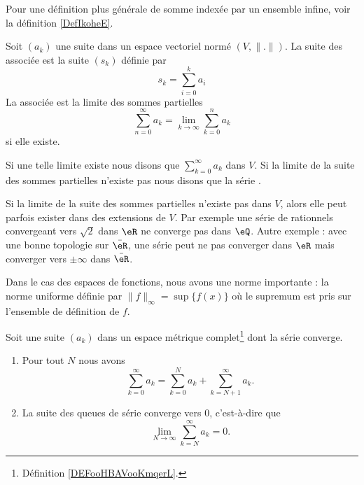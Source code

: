 Pour une définition plus générale de somme indexée par un ensemble infine, voir la définition \ref{DefIkoheE}.
\begin{definition}\label{DefGFHAaOL}
    Soit \( (a_k)\) une suite dans un espace vectoriel normé \( (V,\| . \| )\). La suite des  associée est la suite \( (s_k)\) définie par
    \begin{equation}
        s_k=\sum_{i=0}^ka_i
    \end{equation}
    La  associée est la limite des sommes partielles
    \begin{equation}
        \sum_{n=0}^{\infty}a_k=\lim_{k\to \infty} \sum_{k=0}^na_k
    \end{equation}
    si elle existe.

    Si une telle limite existe nous disons que \( \sum_{k=0}^{\infty}a_k\)  dans \( V\). Si la limite de la suite des sommes partielles n'existe pas nous disons que la série .
\end{definition}

\begin{remark}
    Si la limite de la suite des sommes partielles n'existe pas dans \( V\), alors elle peut parfois exister dans des extensions de \( V\). Par exemple une série de rationnels convergeant vers \( \sqrt{2}\) dans \( \eR\) ne converge pas dans \( \eQ\). Autre exemple : avec une bonne topologie sur \( \bar \eR\), une série peut ne pas converger dans \( \eR\) mais converger vers \( \pm\infty\) dans \( \bar \eR\).
\end{remark}

Dans le cas des espaces de fonctions, nous avons une norme importante : la norme uniforme définie par \( \| f \|_{\infty}=\sup\{ f(x) \}\) où le supremum est pris sur l'ensemble de définition de \( f\).

\begin{lemma}       \label{LEMooHUZEooSyPipb}
    Soit une suite \( (a_k)\) dans un espace métrique complet\footnote{Définition \ref{DEFooHBAVooKmqerL}.} dont la série converge.
    
    \begin{enumerate}
        \item   \label{ITEMooPFSQooDhKFGL}
            Pour tout \( N\) nous avons
            \begin{equation}
                \sum_{k=0}^{\infty}a_k=\sum_{k=0}^Na_k+\sum_{k=N+1}^{\infty}a_k.
            \end{equation}
        \item       \label{ITEMooQNHMooUPjupB}
            La suite des queues de série converge vers \( 0\), c'est-à-dire que
            \begin{equation}
                \lim_{N\to \infty} \sum_{k=N}^{\infty}a_k=0.
            \end{equation}
    \end{enumerate}
\end{lemma}

